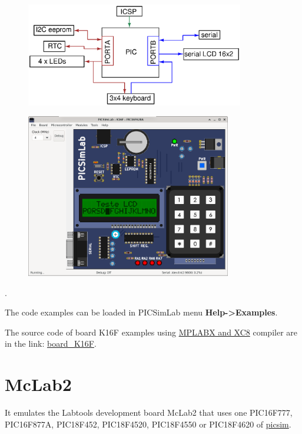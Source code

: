 \begin{figure}[H]
\center
\includegraphics[width=0.85\textwidth]{img/blocks_p2.eps} 
\end{figure} 


\begin{figure}[H]
\center
\includegraphics[width=0.8\textwidth]{img/picsimlab2.png} 
\end{figure} 

.\vspace{0.5cm}

The code examples can be loaded in PICSimLab menu \textbf{Help->Examples}.

The source code of board K16F examples using \href{http://www.microchip.com/mplabx}{MPLABX and XC8} compiler are in
the link: \href{https://lcgamboa.github.io/picsimlab_examples/board_K16F.html}{board\_K16F}.


\section{McLab2}

It emulates the Labtools development board McLab2 that uses one PIC16F777, PIC16F877A, PIC18F452, PIC18F4520, PIC18F4550 or PIC18F4620 of \href{https://github.com/lcgamboa/picsim}{picsim}.


